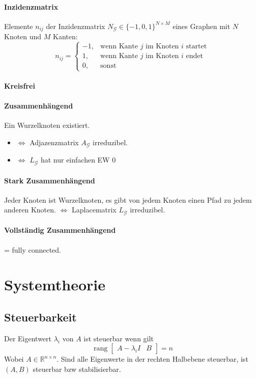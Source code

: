 \paragraph{Inzidenzmatrix}
Elemente $n_{ij}$ der Inzidenzmatrix $N_\mathcal{G} \in \{-1,0,1\}^{N \times M}$ eines Graphen mit $N$ Knoten und $M$ Kanten:
\begin{equation}
    n_{ij} = \begin{cases}
        -1, & \text{wenn Kante $j$ im Knoten $i$ startet} \\
        1,  & \text{wenn Kante $j$ im Knoten $i$ endet} \\
        0,  & \text{sonst}
    \end{cases}
\end{equation}

\paragraph{Kreisfrei}

\paragraph{Zusammenhängend}
Ein Wurzelknoten existiert.
\begin{itemize}
    \item $\iff$ Adjazenzmatrix $A_\mathcal{G}$ irreduzibel.
    \item $\iff$ $L_\mathcal{G}$ hat nur einfachen EW 0
\end{itemize}


\paragraph{Stark Zusammenhängend}
Jeder Knoten ist Wurzelknoten, es gibt von jedem Knoten einen Pfad zu
jedem anderen Knoten.
$\iff$ Laplacematrix $L_\mathcal{G}$ irreduzibel.


\paragraph{Vollständig Zusammenhängend}
= fully connected.


\section{Systemtheorie}

\subsection{Steuerbarkeit}
Der Eigentwert $\lambda_i$ von $A$ ist steuerbar wenn gilt
\begin{equation}
    \operatorname{rang}\begin{bmatrix}
        A-\lambda_i I & B
    \end{bmatrix} = n
\end{equation}
Wobei $A \in \mathbb{R}^{n\times n}$.
Sind alle Eigenwerte in der rechten Halbebene steuerbar, ist $(A, B)$
steuerbar bzw stabilisierbar.

